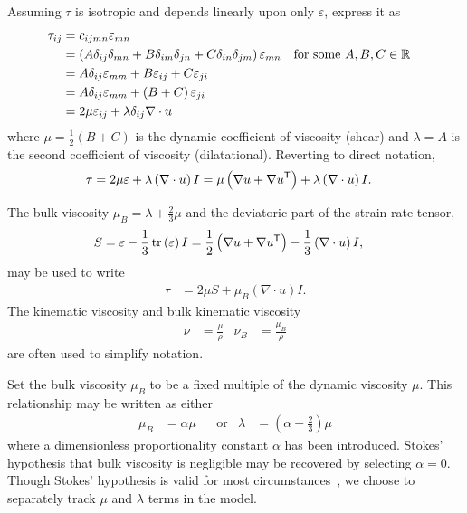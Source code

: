 Assuming $\tau$ is isotropic and depends linearly upon only $\varepsilon$,
express it as
\begin{align}
\tau_{ij}
&= c_{ijmn} \varepsilon_{mn}
\notag \\
&= \left( A \delta_{ij} \delta_{mn}
        + B \delta_{im} \delta_{jn}
        + C \delta_{in} \delta_{jm}
    \right) \varepsilon_{mn}
&
&\text{for some }A, B, C\in\mathbb{R}
\notag \\
&= A \delta_{ij} \varepsilon_{mm} + B\varepsilon_{ij} + C\varepsilon_{ji}
\notag \\
&= A \delta_{ij} \varepsilon_{mm} + \left( B+C \right)\varepsilon_{ji}
\notag \\
&= 2 \mu \varepsilon_{ij} + \lambda\delta_{ij}\nabla\cdot{}u
\end{align}
where $\mu=\frac{1}{2}\left( B + C \right)$ is the dynamic coefficient of
viscosity (shear) and $\lambda=A$ is the second coefficient of viscosity
(dilatational).  Reverting to direct notation,
\begin{align}
\tau
&= 2 \mu \varepsilon + \lambda \left( \nabla\cdot{}u \right) I
\label{eq:taunewt}
 =   \mu \left( \nabla{}u + {\nabla{}u}^{\mathsf{T}} \right)
   + \lambda \left( \nabla\cdot{}u \right) I
.
\end{align}

The bulk viscosity $\mu_{B}=\lambda + \frac{2}{3}\mu$ and the deviatoric
part of the strain rate tensor,
\begin{align}
  S &= \varepsilon - \frac{1}{3} \operatorname{tr}\left(\varepsilon\right) I
     = \frac{1}{2}\left(\nabla{}u + {\nabla{}u}^{\mathsf{T}}\right)
     - \frac{1}{3}\left(\nabla\cdot{}u\right)I,
\end{align}
may be used to write
\begin{align}
\label{eq:tauSmub}
  \tau &= 2 \mu S + \mu_B  \left( \nabla\cdot{}u \right) I
.
\end{align}
The kinematic viscosity and bulk kinematic viscosity
\begin{align}
 \nu &= \frac{\mu}{\rho} & \nu_{B} &= \frac{\mu_{B}}{\rho}
\end{align}
are often used to simplify notation.

\label{sec:stokeshypothesis}

Set the bulk viscosity $\mu_{B}$ to be a fixed multiple of the dynamic
viscosity $\mu$.  This relationship may be written as either
\begin{align}
\label{eq:secondviscosityclaw}
\mu_{B} &= \alpha \mu
&
&\text{or}
&
\lambda &= \left( \alpha - \frac{2}{3} \right) \mu
\end{align}
where a dimensionless proportionality constant $\alpha$ has been introduced.
Stokes' hypothesis that bulk viscosity is negligible may be recovered by
selecting $\alpha = 0$.  Though Stokes' hypothesis is valid for most
circumstances~\citep{GadelHak1995}, we choose to separately track $\mu$ and
$\lambda$ terms in the model.

